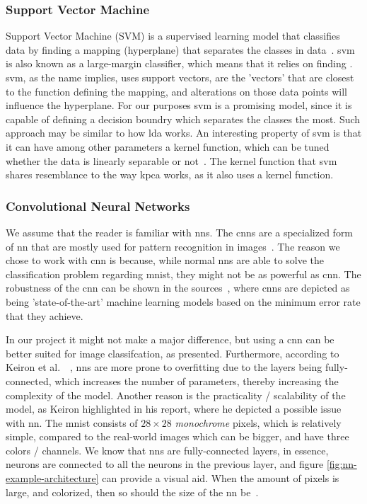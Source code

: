 \subsubsection{Support Vector Machine}\label{subsubsec:support-vector-machine}
Support Vector Machine (SVM) is a supervised learning model that classifies data by finding a mapping (hyperplane) that separates the classes in data~\cite{faster-svm}. \gls{svm} is also known as a large-margin classifier, which means that it relies on finding . \gls{svm}, as the name implies, uses support vectors, are the 'vectors' that are closest to the function defining the mapping, and alterations on those data points will influence the hyperplane. For our purposes \gls{svm} is a promising model, since it is capable of defining a decision boundry which separates the classes the most. Such approach may be similar to how \gls{lda} works. An interesting property of \gls{svm} is that it can have among other parameters a kernel function, which can be tuned whether the data is linearly separable or not~\cite{faster-svm}. The kernel function that \gls{svm} shares resemblance to the way \gls{kpca} works, as it also uses a kernel function.

\subsubsection{Convolutional Neural Networks}\label{subsubsec:convolutional-neural-networks}
We assume that the reader is familiar with \gls{nn}s. The \gls{cnn}s are a specialized form of \gls{nn} that are mostly used for pattern recognition in images~\cite{introduction-to-cnn}. The reason we chose to work with \gls{cnn} is because, while normal \gls{nn}s are able to solve the classification problem regarding \gls{mnist}, they might not be as powerful as \gls{cnn}. The robustness of the \gls{cnn} can be shown in the sources~\cite{lecun-mnist-database, mnist-classification-benchmark}, where \gls{cnn}s are depicted as being 'state-of-the-art' machine learning models based on the minimum error rate that they achieve.


In our project it might not make a major difference, but using a \gls{cnn} can be better suited for image classifcation, as presented. Furthermore, according to Keiron et al.\ ~\cite{introduction-to-cnn}, \gls{nn}s are more prone to overfitting due to the layers being fully-connected, which increases the number of parameters, thereby increasing the complexity of the model. Another reason is the practicality / scalability of the model, as Keiron highlighted in his report, where he depicted a possible issue with \gls{nn}. The \gls{mnist} consists of $28 \times 28$ \textit{monochrome} pixels, which is relatively simple, compared to the real-world images which can be bigger, and have three colors / channels. We know that \gls{nn}s are fully-connected layers, in essence, neurons are connected to all the neurons in the previous layer, and figure \ref{fig:nn-example-architecture} can provide a visual aid. When the amount of pixels is large, and colorized, then so should the size of the \gls{nn} be~\cite{introduction-to-cnn}.

